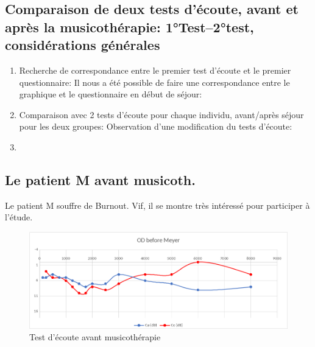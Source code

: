 \begin{itemize}
      


  

\section{Comparaison de deux tests d'écoute, avant et après la musicothérapie: 1°Test--2°test, considérations générales}
	
        \begin{enumerate}
             
        \item Recherche de correspondance entre le premier test d'écoute et
     le premier questionnaire: Il nous a été possible de faire une
     correspondance entre le graphique et le questionnaire en début de
     séjour:


     
     
        \item Comparaison avec 2 tests d'écoute pour chaque individu,
          avant/après séjour pour les deux groupes:
          Observation d'une modification du tests d'écoute:


          
        
        \item
\end{enumerate}
	
\subsection{Le patient M avant musicoth.}

 	Le patient M souffre de Burnout. Vif, il se montre très
        intéressé pour participer à l'étude.
 
 	
 	\begin{figure}[tbh]
 		\centering
 		\includegraphics[width=0.7\linewidth]{images/clinique/od_before_meyer.png}
 		\caption{Test d'écoute avant musicothérapie}
 		\label{fig:odbeforemeyer}
 	\end{figure}
 	
 	
 	
 	
 	

\end{itemize}
